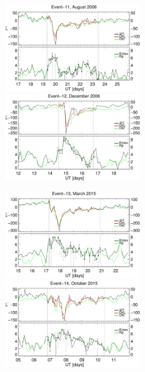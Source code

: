 \documentclass[a4paper,fleqn]{cas-dc}
\begin{document}
\begin{figure}[h!]
    \centering
    \centerline{\Large \bf   
         \hfill}
          \centerline{\Large \bf   
      \hspace{0.26\textwidth}  \color{black}{}
       \hspace{0.31\textwidth}  \color{black}{}
         \hfill}
     \includegraphics[width=6.0cm]{images/dH_approx/diono_valid_V4_2006-08-17.eps}
     \includegraphics[width=6.0cm]{images/dH_approx/diono_valid_V4_2006-12-12.eps}
     \centerline{\Large \bf   
      \hspace{0.275\textwidth}  \color{black}{}
       \hspace{0.295\textwidth}  \color{black}{}
         \hfill}
     \includegraphics[width=6.0cm]{images/dH_approx/diono_valid_V4_2015-03-15.eps}     
     \includegraphics[width=6.0cm]{images/dH_approx/diono_valid_V4_2015-10-05.eps}

\end{figure}
\end{document}
